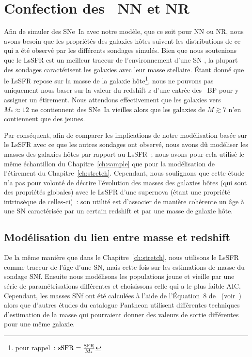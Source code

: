 \documentclass[../main/main.tex]{subfiles}
\begin{document}
\section{Confection des \hostlib\ NN et NR}\label{sec:hmake}

Afin de simuler des SNe~Ia avec notre modèle, que ce soit pour NN ou NR, nous
avons besoin que les propriétés des galaxies hôtes suivent les distributions de
ce qui a été observé par les différents sondages simulés. Bien que nous
soutenions que le LsSFR est un meilleur traceur de l'environnement d'une SN
\citep{briday2022}, la plupart des sondages caractérisent les galaxies avec leur
masse stellaire. Étant donné que le LsSFR repose sur la masse de la galaxie
hôte\footnote{pour rappel~: $\mathrm{sSFR} = \frac{\rm SFR}{M_*}$}, nous ne
pouvons pas uniquement nous baser sur la valeur du redshift $z$ d'une entrée des
\hostlib\ BP pour y assigner un étirement. Nous attendons effectivement que les
galaxies vers $M_*\approx12$ ne contiennent des SNe~Ia vieilles  alors que les
galaxies de $M \gtrsim 7$ n'en contiennent que des jeunes.

Par conséquent, afin de comparer les implications de notre modélisation basée
sur le LsSFR avec ce que les autres sondages ont observé, nous avons dû
modéliser les masses des galaxies hôtes par rapport au LsSFR~; nous avons pour
cela utilisé le même échantillon du Chapitre~\ref{ch:sample} que pour la
modélisation de l'étirement du Chapitre~\ref{ch:stretch}. Cependant, nous
soulignons que cette étude n'a pas pour volonté de décrire l'évolution des
masses des galaxies hôtes (qui sont des propriétés globales) avec le LsSFR d'une
supernova (étant une propriété intrinsèque de celles-ci)~: son utilité est
d'associer de manière cohérente un âge à une SN caractérisée par un certain
redshift et par une masse de galaxie hôte.

\subsection{Modélisation du lien entre masse et redshift}\label{ssec:mmod}

De la même manière que dans le Chapitre~\ref{ch:stretch}, nous utilisons le
LsSFR comme traceur de l'âge d'une SN, mais cette fois sur les estimations de
masse du sondage SNf. Ensuite nous modélisons les populations jeune et vieille
par une série de paramétrisations différentes et choisissons celle qui a le plus
faible AIC. Cependant, les masses SNf ont été calculées à l'aide de l'Équation~8
de~\cite{taylor2011} (voir~\cite{rigault2020}) alors que d'autres études du
catalogue Pantheon utilisent différentes techniques d'estimation de la masse qui
pourraient donner des valeurs de sortie différentes pour une même galaxie.
\end{document}
